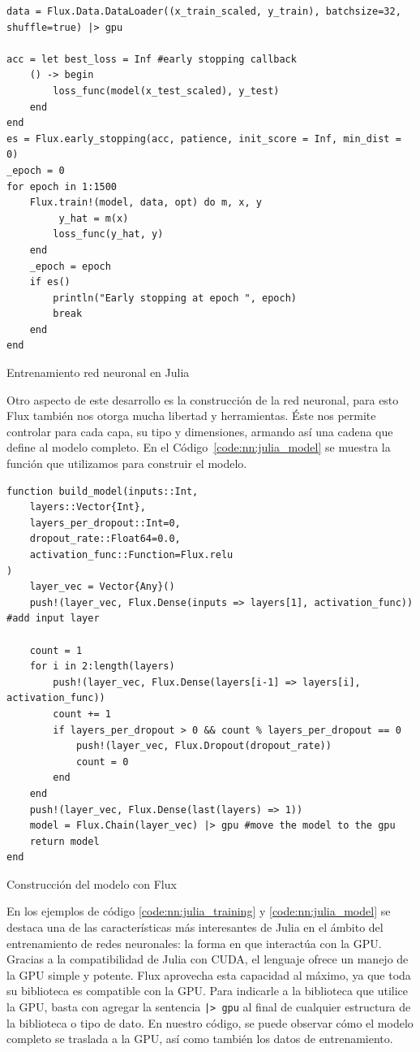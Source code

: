 \documentclass[11pt]{article}
\begin{document}
\begin{listing}[h]
\begin{verbatim}
data = Flux.Data.DataLoader((x_train_scaled, y_train), batchsize=32, shuffle=true) |> gpu
    
acc = let best_loss = Inf #early stopping callback
    () -> begin
        loss_func(model(x_test_scaled), y_test)
    end 
end
es = Flux.early_stopping(acc, patience, init_score = Inf, min_dist = 0)
_epoch = 0
for epoch in 1:1500
    Flux.train!(model, data, opt) do m, x, y
         y_hat = m(x)
        loss_func(y_hat, y)
    end
    _epoch = epoch
    if es()
        println("Early stopping at epoch ", epoch)
        break
    end
end
\end{verbatim}
\caption{Entrenamiento red neuronal en Julia}
\label{code:nn:julia_training}
\end{listing}

Otro aspecto de este desarrollo es la construcción de la red neuronal, para esto Flux también nos otorga mucha libertad y herramientas. Éste nos permite controlar para cada capa, su tipo y dimensiones, armando así una cadena que define al modelo completo. En el Código~\ref{code:nn:julia_model} se muestra la función que utilizamos para construir el modelo.

\begin{listing}[h]
\begin{verbatim}
function build_model(inputs::Int,
    layers::Vector{Int},
    layers_per_dropout::Int=0,
    dropout_rate::Float64=0.0,
    activation_func::Function=Flux.relu
)
    layer_vec = Vector{Any}()
    push!(layer_vec, Flux.Dense(inputs => layers[1], activation_func)) #add input layer

    count = 1
    for i in 2:length(layers)
        push!(layer_vec, Flux.Dense(layers[i-1] => layers[i], activation_func))
        count += 1
        if layers_per_dropout > 0 && count % layers_per_dropout == 0
            push!(layer_vec, Flux.Dropout(dropout_rate))
            count = 0
        end
    end
    push!(layer_vec, Flux.Dense(last(layers) => 1))
    model = Flux.Chain(layer_vec) |> gpu #move the model to the gpu
    return model
end
\end{verbatim}
\caption{Construcción del modelo con Flux}
\label{code:nn:julia_model}
\end{listing}

En los ejemplos de código \ref{code:nn:julia_training} y \ref{code:nn:julia_model} se destaca una de las características más interesantes de Julia en el ámbito del entrenamiento de redes neuronales: la forma en que interactúa con la GPU. Gracias a la compatibilidad de Julia con CUDA, el lenguaje ofrece un manejo de la GPU simple y potente. Flux aprovecha esta capacidad al máximo, ya que toda su biblioteca es compatible con la GPU. Para indicarle a la biblioteca que utilice la GPU, basta con agregar la sentencia \lstinline{|> gpu} al final de cualquier estructura de la biblioteca o tipo de dato. En nuestro código, se puede observar cómo el modelo completo se traslada a la GPU, así como también los datos de entrenamiento.
\end{document}
